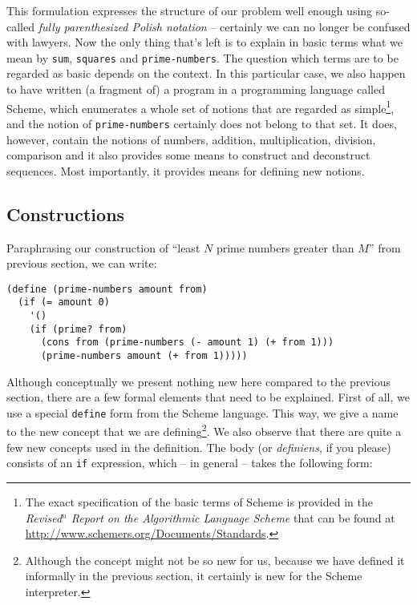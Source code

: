 This formulation expresses the structure of our problem
well enough using so-called \textit{fully parenthesized
Polish notation} -- certainly we can no longer be confused
with lawyers. Now the only thing that's left is to explain
in basic terms what we mean by \texttt{sum}, \texttt{squares}
and \texttt{prime-numbers}. The question which terms
are to be regarded as basic depends on the context.
In this particular case, we also happen to have written
(a fragment of) a program in a programming language called Scheme,
which enumerates a whole set of notions that are regarded as 
simple\footnote{The exact specification of the basic terms
of Scheme is provided in the \textit{Revised$^n$ Report on the
Algorithmic Language Scheme} that can be found at
\url{http://www.schemers.org/Documents/Standards}.}, and the notion of
\texttt{prime-numbers} certainly does not belong to that set.
It does, however, contain the notions of numbers, addition,
multiplication, division, comparison and it also provides some means
to construct and deconstruct sequences. Most importantly,
it provides means for defining new notions.

\subsection{Constructions}

Paraphrasing our construction of ``least $N$ prime numbers 
greater than $M$'' from previous section, we can write:

\begin{Verbatim}[samepage=true]
(define (prime-numbers amount from)
  (if (= amount 0)
    '()
    (if (prime? from)
      (cons from (prime-numbers (- amount 1) (+ from 1)))
      (prime-numbers amount (+ from 1)))))
\end{Verbatim}

Although conceptually we present nothing new here compared to
the previous section, there are a few formal elements that need
to be explained. First of all, we use a special \texttt{define}
form from the Scheme language. This way, we give a name
to the new concept that we are defining\footnote{Although the
concept might not be so new for us, because we have defined
it informally in the previous section, it certainly is new for
the Scheme interpreter.}. We also observe that there are
quite a few new concepts used in the definition. The body (or
\textit{definiens}, if you please) consists of an \texttt{if}
expression, which -- in general -- takes the following form:

